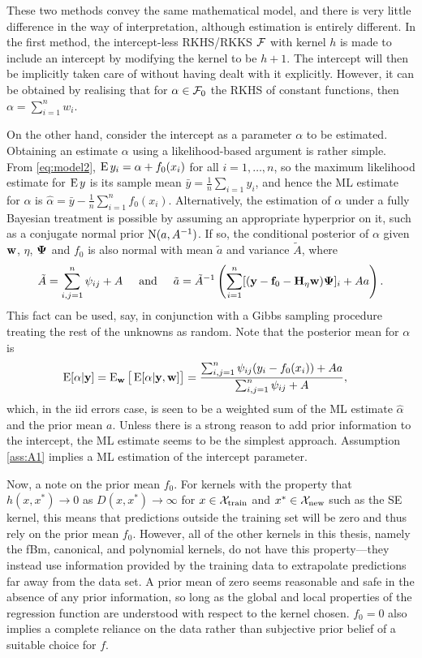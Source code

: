 These two methods convey the same mathematical model, and there is very little difference in the way of interpretation, although estimation is entirely different. 
In the first method, the intercept-less RKHS/RKKS ${\mathcal F}$ with kernel $h$ is made to include an intercept by modifying the kernel to be $h + 1$.
The intercept will then be implicitly taken care of without having dealt with it explicitly.
However, it can be obtained by realising that for $\alpha\in{\mathcal F}_0$ the RKHS of constant functions, then $\alpha = \sum_{i=1}^n w_i$.

On the other hand, consider the intercept as a parameter $\alpha$ to be estimated.
Obtaining an estimate $\alpha$ using a likelihood-based argument is rather simple.
From \eqref{eq:model2}, $\operatorname{E} y_i = \alpha + f_0(x_i)$ for all $i=1,\dots,n$, so the maximum likelihood estimate for $\operatorname{E} y$ is its sample mean $\bar y = \frac{1}{n}\sum_{i=1} y_i$, and hence the ML estimate for $\alpha$ is $\hat\alpha = \bar y - \frac{1}{n} \sum_{i=1}^n f_0(x_i)$.
Alternatively, the estimation of $\alpha$ under a fully Bayesian treatment is possible by assuming an appropriate hyperprior on it, such as a conjugate normal prior $\operatorname{N}(a,A^{-1})$.
If so, the conditional posterior of $\alpha$ given ${\mathbf w}$, $\eta$, ${\bm\Psi}$ and $f_0$ is also normal with mean $\tilde a$ and variance $\tilde A$, where
\[
  \tilde A = \sum_{i,j=1}^n \psi_{ij} + A
  \hspace{0.5cm}\text{and}\hspace{0.5cm}
  \tilde a = \tilde A^{-1}\left( \sum_{i=1}^n [({\mathbf y}-{\mathbf f}_0-{\mathbf H}_\eta {\mathbf w}){\bm\Psi}]_i + Aa \right).
\]
This fact can be used, say, in conjunction with a Gibbs sampling procedure treating the rest of the unknowns as random.
Note that the posterior mean for $\alpha$ is
\begin{align*}
  \operatorname{E} [\alpha|{\mathbf y}] 
  &= \operatorname{E}_{\mathbf w}\big[ \operatorname{E} [\alpha|{\mathbf y},{\mathbf w}] \big] 
  = \frac{\sum_{i,j=1}^n \psi_{ij}(y_i-f_0(x_i)) + Aa}{\sum_{i,j=1}^n \psi_{ij} + A},
\end{align*}
which, in the iid errors case, is seen to be a weighted sum of the ML estimate $\hat\alpha$ and the prior mean $a$.
Unless there is a strong reason to add prior information to the intercept, the ML estimate seems to be the simplest approach.
Assumption \ref{ass:A1} implies a ML estimation of the intercept parameter.

Now, a note on the prior mean $f_0$.
For kernels with the property that $h(x,x^*) \to 0$ as $D(x,x^*) \to \infty$ for $x \in {\mathcal X}_{\text{train}}$ and $x^* \in {\mathcal X}_\text{new}$ such as the SE kernel, this means that predictions outside the training set will be zero and thus rely on the prior mean $f_0$.
However, all of the other kernels in this thesis, namely the fBm, canonical, and polynomial kernels, do not have this property---they instead use information provided by the training data to extrapolate predictions far away from the data set.
A prior mean of zero seems reasonable and safe in the absence of any prior information, so long as the global and local properties of the regression function are understood with respect to the kernel chosen.
$f_0=0$ also implies a complete reliance on the data rather than subjective prior belief of a suitable choice for $f$.

